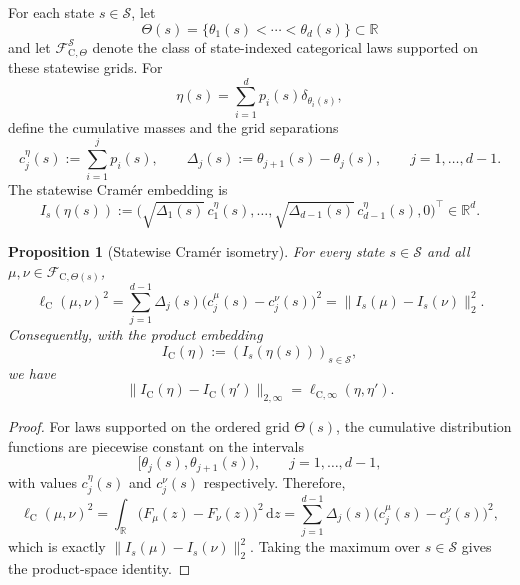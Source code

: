 \documentclass{article}
\newtheorem{proposition}[theorem]{Proposition}
\newcommand{\X}{\mathcal{S}}
\begin{document}
For each state $s\in \X$, let
\begin{equation}
\Theta(s)=\{\theta_1(s)<\cdots<\theta_d(s)\}\subset\mathbb R
\end{equation}
and let $\mathcal F^{\X}_{\mathrm C,\Theta}$ denote the class of state-indexed categorical laws supported on these statewise grids. For
\begin{equation}
\eta(s)=\sum_{i=1}^d p_i(s)\delta_{\theta_i(s)},
\end{equation}
define the cumulative masses and the grid separations
\begin{equation}
c^\eta_j(s) := \sum_{i=1}^j p_i(s),
\qquad
\Delta_j(s) := \theta_{j+1}(s)-\theta_j(s),
\qquad
j=1,\dots,d-1.
\end{equation}
The statewise Cram\'er embedding is
\begin{equation}
I_s(\eta(s)) := \bigl(\sqrt{\Delta_1(s)}\,c^\eta_1(s), \dots, \sqrt{\Delta_{d-1}(s)}\,c^\eta_{d-1}(s),0\bigr)^\top \in\mathbb R^d.
\end{equation}

\begin{proposition}[Statewise Cram\'er isometry]
\label{prop:ctd-isometry}
For every state $s\in \X$ and all $\mu,\nu\in \mathcal F_{\mathrm C,\Theta(s)}$,
\begin{equation}
\ell_{\mathrm C}(\mu,\nu)^2 = \sum_{j=1}^{d-1}\Delta_j(s)\bigl(c^\mu_j(s)-c^\nu_j(s)\bigr)^2 = \lVert I_s(\mu)-I_s(\nu) \rVert_2^2.
\end{equation}
Consequently, with the product embedding
\begin{equation}
I_{\mathrm C}(\eta):=(I_s(\eta(s)))_{s\in \X},
\end{equation}
we have
\begin{equation}
\lVert I_{\mathrm C}(\eta)-I_{\mathrm C}(\eta') \rVert_{2,\infty} = \ell_{\mathrm C,\infty}(\eta,\eta').
\end{equation}
\end{proposition}

\begin{proof}
For laws supported on the ordered grid $\Theta(s)$, the cumulative distribution functions are piecewise
constant on the intervals
\begin{equation}
[\theta_j(s),\theta_{j+1}(s)), \qquad j=1,\dots,d-1,
\end{equation}
with values $c^\eta_j(s)$ and $c^\nu_j(s)$ respectively. Therefore,
\begin{equation}
\ell_{\mathrm C}(\mu,\nu)^2 = \int_{\mathbb R}\bigl(F_\mu(z)-F_\nu(z)\bigr)^2\,\mathrm dz = \sum_{j=1}^{d-1}\Delta_j(s)\bigl(c^\mu_j(s)-c^\nu_j(s)\bigr)^2,
\end{equation}
which is exactly $\lVert I_s(\mu)-I_s(\nu) \rVert_2^2$. Taking the maximum over $s\in \X$ gives the product-space identity.
\end{proof}
\end{document}
